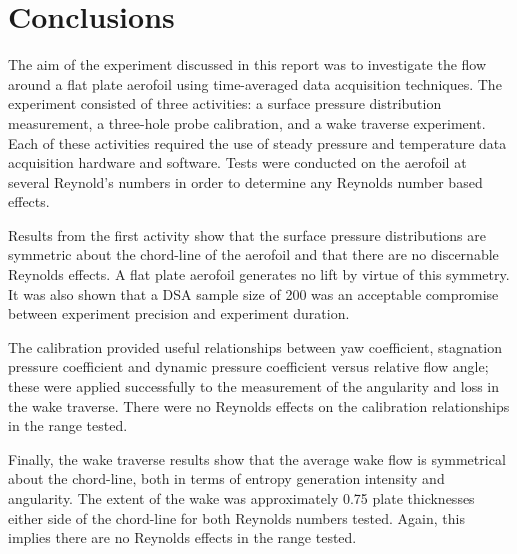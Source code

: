\documentclass[11pt,a4paper,twocolumn]{article}
\begin{document}
\section{Conclusions}
The aim of the experiment discussed in this report was to investigate the flow around a flat plate aerofoil using time-averaged data acquisition techniques. The experiment consisted of three activities: a surface pressure distribution measurement, a three-hole probe calibration, and a wake traverse experiment. Each of these activities required the use of steady pressure and temperature data acquisition hardware and software. Tests were conducted on the aerofoil at several Reynold’s numbers in order to determine any Reynolds number based effects. 

Results from the first activity show that the surface pressure distributions are symmetric about the chord-line of the aerofoil and that there are no discernable Reynolds effects. A flat plate aerofoil generates no lift by virtue of this symmetry. It was also shown that a DSA sample size of 200 was an acceptable compromise between experiment precision and experiment duration.

The calibration provided useful relationships between yaw coefficient, stagnation pressure coefficient and dynamic pressure coefficient versus relative flow angle; these were applied successfully to the measurement of the angularity and loss in the wake traverse. There were no Reynolds effects on the calibration relationships in the range tested. 

Finally, the wake traverse results show that the average wake flow is symmetrical about the chord-line, both in terms of entropy generation intensity and angularity. The extent of the wake was approximately 0.75 plate thicknesses either side of the chord-line for both Reynolds numbers tested. Again, this implies there are no Reynolds effects in the range tested. 



%
%
\end{document}
